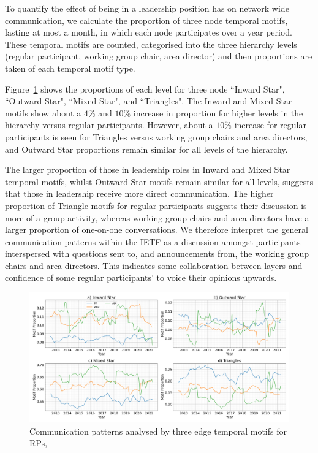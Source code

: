 \documentclass[twocolumn,10pt]{article}
\newlength{\figureWidthTwoColumn}
\newcommand{\pb}[1]{\vspace{0.75ex}\noindent{\textbf{#1}}}
\begin{document}
\pb{Impact of Role on Communication Patterns:}
To quantify the effect of being in a leadership position has on network
wide communication, we calculate the proportion of three node temporal
motifs, lasting at most a month, in which each node participates over a
year period. These temporal motifs are counted, categorised into the three
hierarchy levels (regular participant, working group chair, area director)
and then proportions are taken of each temporal motif type. 

Figure~\ref{fig:motif_proportions} shows the proportions of each level for
three node ``Inward Star", ``Outward Star", ``Mixed Star", and
``Triangles". The Inward and Mixed Star motifs show about a $4\%$ and
$10\%$ increase in proportion for higher levels in the hierarchy versus
regular participants. However, about a $10\%$ increase for regular
participants is seen for Triangles versus working group chairs and area
directors, and Outward Star proportions remain similar for all levels of
the hierarchy.

The larger proportion of those in leadership roles in Inward and Mixed Star
temporal motifs, whilst Outward Star motifs remain similar for all levels,
suggests that those in leadership receive more direct communication. The
higher proportion of Triangle motifs for regular participants suggests
their discussion is more of a group activity, whereas working group chairs
and area directors have a larger proportion of one-on-one conversations.  
We therefore interpret the general communication patterns within the IETF
as a discussion amongst participants interspersed with questions sent to,
and announcements from, the working group chairs and area directors.  This
indicates some collaboration between layers and confidence of some regular
participants' to voice their opinions upwards.

\begin{figure}[t]
  \centering
  \includegraphics[width=\figureWidthTwoColumn]{figures-prev/icwsm-2024/motif_strata_comparison.png}
  \caption{
    Communication patterns analysed by three edge temporal motifs for RPs,
  }
  \label{fig:motif_proportions}
\end{figure}
\end{document}
